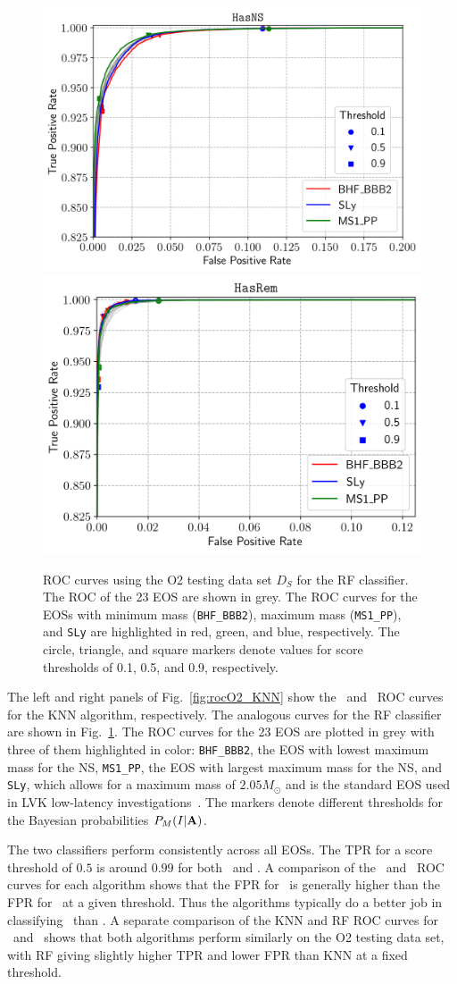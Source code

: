 \begin{figure}[h]
\includegraphics[width=0.45\linewidth]{roc_testing_RF_NS}
\includegraphics[width=0.45\linewidth]{roc_testing_RF_REM}
\caption{\ac{ROC} curves using the O2 testing data set $D_S$ for the \ac{RF} classifier. The \ac{ROC} of the 23 \ac{EOS} are shown in grey. The \ac{ROC} curves for the \ac{EOS}s with minimum mass ({\tt BHF\_BBB2}), maximum mass ({\tt MS1\_PP}), and {\tt SLy} are highlighted in red, green, and blue, respectively. The circle, triangle, and square markers denote values for score thresholds of 0.1, 0.5, and 0.9, respectively.}
\label{fig:rocO2_RF}
\end{figure}

The left and right panels of Fig.~\ref{fig:rocO2_KNN} show the \hasns\ and \hasrem\ \ac{ROC} curves for the \ac{KNN} algorithm, respectively. The analogous curves for the \ac{RF}
classifier are shown in Fig.~\ref{fig:rocO2_RF}. The \ac{ROC} curves for the 23 \ac{EOS} are plotted in grey with three of them highlighted in color: {\tt BHF\_BBB2}, the \ac{EOS}
with lowest maximum mass for the NS, {\tt MS1\_PP}, the \ac{EOS} with largest maximum mass for the \ac{NS}, and {\tt SLy}, which allows for a maximum mass of $2.05 M_\odot$ and is
the standard \ac{EOS} used in \ac{LVK} low-latency investigations~\cite{Ghosh:2021eqv}. The markers denote different thresholds for the Bayesian probabilities $P_M(I|{\bf A})$. 


The two classifiers perform consistently across all \ac{EOS}s. The \ac{TPR} for a score threshold of $0.5$ is around $0.99$ for both \hasns\ and \hasrem. A comparison of the
\hasns\ and \hasrem\ \ac{ROC} curves for each algorithm shows that the \ac{FPR} for \hasns\ is generally higher than the \ac{FPR} for \hasrem\ at a given threshold. Thus the algorithms
typically do a better job in classifying \hasrem\ than \hasns. A separate comparison of the \ac{KNN} and \ac{RF} \ac{ROC} curves for \hasns\ and \hasrem\ shows that both algorithms perform
similarly on the O2 testing data set, with \ac{RF} giving slightly higher \ac{TPR} and lower \ac{FPR} than \ac{KNN} at a fixed threshold. 

